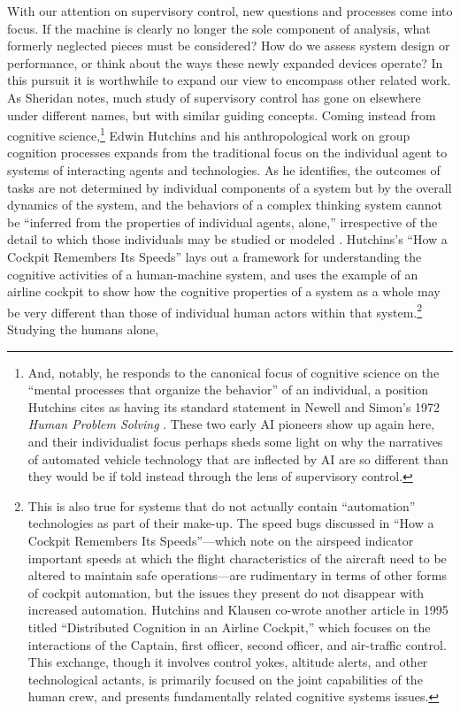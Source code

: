 With our attention on supervisory control, new questions and processes
come into focus. If the machine is clearly no
longer the sole component of analysis, what formerly neglected pieces
must be considered? How do we assess system design or performance, or
think about the ways these newly expanded devices operate? In this
pursuit it is worthwhile to expand our
view to encompass other related work. As Sheridan notes, much study of
supervisory control has gone on elsewhere under different names, but
with similar guiding concepts. Coming instead from cognitive
science,\footnote{And, notably, he responds to the canonical focus of
  cognitive science on the ``mental processes that organize the
  behavior'' of an individual, a position Hutchins cites as having its
standard statement in Newell and Simon's 1972 \emph{Human Problem
  Solving} \cite[p. 265-266]{hutchinsCockpit}. These two early AI pioneers show
up again here, and their individualist focus perhaps sheds some 
light on why the narratives of automated vehicle technology that are
inflected by AI are so different than they would be if told instead
through the lens of supervisory control.}
Edwin Hutchins and his anthropological work on group cognition
processes expands from the traditional focus on the individual agent
to systems of interacting agents and technologies. As he identifies,
the outcomes of tasks are not determined by individual components of a
system but by the overall dynamics of the system, and the behaviors of
a complex thinking system cannot be ``inferred from the properties of
individual agents, alone,'' irrespective of the detail to which those
individuals may be studied or modeled \cite[p. 265]{hutchinsCockpit}.
Hutchins's ``How a Cockpit Remembers Its Speeds'' lays out a framework
for understanding the cognitive activities of a human-machine system,
and uses the example of an airline cockpit to show how the cognitive
properties of a system as a whole may be very different than those of
individual human actors within that system.\footnote{This is also true
for systems that do not actually contain ``automation'' technologies
as part of their make-up. The speed bugs discussed in ``How a Cockpit
Remembers Its Speeds''---which note on the airspeed indicator
important speeds at which the 
flight characteristics of the aircraft need to be altered to maintain
safe operations---are rudimentary in terms of other forms of
cockpit automation, but the issues they present do not disappear with
increased automation. Hutchins and Klausen co-wrote another
article in 1995 titled ``Distributed Cognition in an Airline
Cockpit,'' \cite{hutchinsKlausen} which focuses on the
interactions of the Captain, first 
officer, second officer, and air-traffic control. This exchange,
though it involves control yokes, altitude alerts, and other
technological actants, is primarily focused on the joint capabilities
of the human crew, and presents fundamentally related cognitive
systems issues.} Studying the humans alone,
